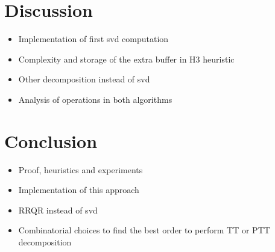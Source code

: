 \documentclass[runningheads]{llncs}
\begin{document}

\section{Discussion}
\label{sec:discussion}
\begin{itemize}
	\item Implementation of first svd computation
	\item Complexity and storage of the extra buffer in H3 heuristic
	\item Other decomposition instead of svd
	\item Analysis of operations in both algorithms
\end{itemize}

\section{Conclusion}
\label{sec:conclusion}
\begin{itemize}
	\item Proof, heuristics and experiments
	\item Implementation of this approach
	\item RRQR instead of svd
	\item Combinatorial choices to find the best order to perform TT or PTT decomposition
\end{itemize}

%
%
%
 
 
\end{document}
